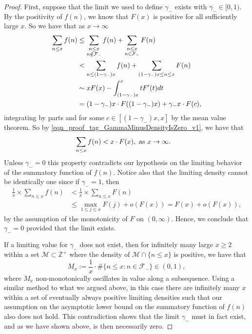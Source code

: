 \documentclass[11pt,reqno,a4letter]{article}
\numberwithin{figure}{section}
\numberwithin{table}{section}
\theoremstyle{plain}
\numberwithin{theorem}{section}
\theoremstyle{definition}
\begin{document}
\begin{proof} 
First, suppose that the limit we used to define $\gamma_{-}$ exists with $\gamma_{-} \in [0, 1)$. 
By the positivity of $f(n)$, we know that $F(x)$ is positive for all sufficiently large $x$. 
So we have that as $x \rightarrow \infty$ 
\begin{align} 
\notag 
\sum_{n \leq x} f(n) & \leq \sum_{\substack{n \leq x \\ n \notin \mathcal{F}_{-}}} f(n) + 
     \sum_{\substack{n \leq x \\ n \in \mathcal{F}_{-}}} F(n) \\ 
\notag 
     & < \sum_{n \leq (1-\gamma_{-}) x} f(n) + 
     \sum_{(1-\gamma_{-}) x \leq n \leq x} F(n) \\ 
\notag 
     & \sim 
     x F(x) - \int_{(1-\gamma_{-}) x}^{x} t F^{\prime}(t) dt \\ 
\label{eqn_proof_tag_GammaMinusDensityIsZero_v1} 
     & = (1-\gamma_{-}) x \cdot F((1-\gamma_{-}) x) + \gamma_{-} x \cdot F(c), 
\end{align} 
integrating by parts and for some $c \in [(1-\gamma_{-}) x, x]$ by the mean value theorem. 
So by \eqref{eqn_proof_tag_GammaMinusDensityIsZero_v1}, we have that 
\begin{align} 
\notag 
\sum_{n \leq x} f(n) & < x \cdot F(x), \mathrm{\ as\ } x \rightarrow \infty. 
\end{align} 
Unless $\gamma_{-} = 0$ this property contradicts our hypothesis on the limiting behavior 
of the summatory function of $f(n)$. 
Notice also that the limiting density cannot be identically one since if $\gamma_{-} = 1$, then 
\begin{align*} 
\frac{1}{x} \times \sum_{n \leq x} f(n) & < \frac{1}{x} \times \sum_{n \leq x} F(n) \\ 
     & \leq \max_{1 \leq j \leq x} F(j) + o(F(x)) = F(x) + o(F(x)), 
\end{align*} 
by the assumption of the monotonicity of $F$ on $(0, \infty)$. 
Hence, we conclude that $\gamma_{-} = 0$ provided that the limit exists. 

If a limiting value for $\gamma_{-}$ does not exist, then for infinitely many large $x \geq 2$ within 
a set $\mathcal{M} \subset \mathbb{Z}^{+}$ where the density of 
$\mathcal{M} \cap \{n \leq x\}$ is positive, we have that 
\[
M_x := \frac{1}{x} \cdot \#\{n \leq x: n \in \mathcal{F}_{-}\} \in (0, 1), 
\]
where $M_x$ non-monotonically oscillates in value along a subsequence. 
Using a similar method to what we argued above, in this case there are infinitely many $x$ within a set of 
eventually always positive limiting densities such that 
our assumption on the asymptotic lower bound on 
the summatory function of $f(n)$ also does not hold. 
This contradiction shows that the limit $\gamma_{-}$ 
must in fact exist, and as we have shown above, is then necessarily zero. 
\end{proof} 
\end{document}
